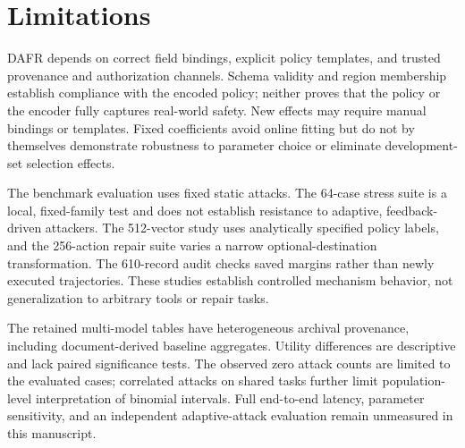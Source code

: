 \documentclass[11pt]{article}
\begin{document}
\section{Limitations}

DAFR depends on correct field bindings, explicit policy templates, and trusted provenance and authorization channels. Schema validity and region membership establish compliance with the encoded policy; neither proves that the policy or the encoder fully captures real-world safety. New effects may require manual bindings or templates. Fixed coefficients avoid online fitting but do not by themselves demonstrate robustness to parameter choice or eliminate development-set selection effects.

The benchmark evaluation uses fixed static attacks. The 64-case stress suite is a local, fixed-family test and does not establish resistance to adaptive, feedback-driven attackers. The 512-vector study uses analytically specified policy labels, and the 256-action repair suite varies a narrow optional-destination transformation. The 610-record audit checks saved margins rather than newly executed trajectories. These studies establish controlled mechanism behavior, not generalization to arbitrary tools or repair tasks.

The retained multi-model tables have heterogeneous archival provenance, including document-derived baseline aggregates. Utility differences are descriptive and lack paired significance tests. The observed zero attack counts are limited to the evaluated cases; correlated attacks on shared tasks further limit population-level interpretation of binomial intervals. Full end-to-end latency, parameter sensitivity, and an independent adaptive-attack evaluation remain unmeasured in this manuscript.


\end{document}
